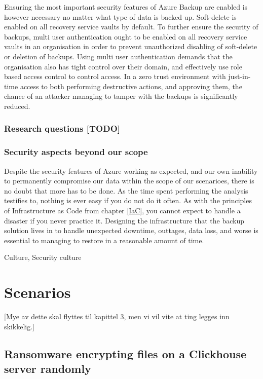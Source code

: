 Ensuring the most important security features of Azure Backup are enabled is however necessary no matter what type of data is backed up. Soft-delete is enabled on all recovery service vaults by default. To further ensure the security of backups, multi user authentication ought to be enabled on all recovery service vaults in an organisation in order to prevent unauthorized disabling of soft-delete or deletion of backups. Using multi user authentication demands that the organisation also has tight control over their domain, and effectively use role based access control to control access. In a zero trust environment with just-in-time access to both performing destructive actions, and approving them, the chance of an attacker managing to tamper with the backups is significantly reduced.  




\subsection{Research questions [TODO]}

\subsection{Security aspects beyond our scope}

Despite the security features of Azure working as expected, and our own inability to permanently compromise our data within the scope of our scenarioes, there is no doubt that more has to be done. As the time spent performing the analysis testifies to, nothing is ever easy if you do not do it often. As with the principles of Infrastructure as Code from chapter  \ref{IaC}, you cannot expect to handle a disaster if you never practice it. Designing the infrastructure that the backup solution lives in to handle unexpected downtime, outtages, data loss, and worse is essential to managing to restore in a reasonable amount of time. 

Culture, Security culture




\chapter{Scenarios}
[Mye av dette skal flyttes til kapittel 3, men vi vil vite at ting legges inn skikkelig.]

\section{Ransomware encrypting files on a Clickhouse server randomly}

